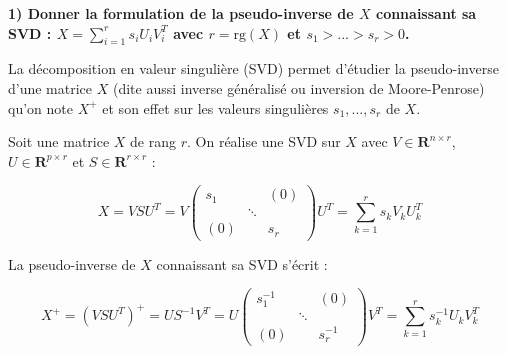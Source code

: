 \usepackage{amsmath}


\textbf{1) Donner la formulation de la pseudo-inverse de $X$ connaissant sa SVD : $X = \sum_{i=1}^r s_i U_i V_{i}^T$ avec $r=\mathrm{rg}(X)$ et $s_1 > ... > s_r > 0$.}

\bigskip

La d\'ecomposition en valeur singuli\`ere (SVD) permet d'\'etudier la pseudo-inverse d'une matrice $X$ (dite aussi inverse g\'en\'eralis\'e ou inversion de Moore-Penrose) qu'on note $X^{+}$ et son effet sur les valeurs singuli\`eres $s_1,...,s_r$ de $X$.

\bigskip

Soit une matrice $X$ de rang $r$. On r\'ealise une SVD sur $X$ avec $V \in \mathbf{R}^{n \times r}$, $ U \in \mathbf{R}^{p\times r}$ et $ S \in \mathbf{R}^{r\times r}$ :

$$ X = V S U^T = V \begin{pmatrix} s_1 & & (0) \\ & \ddots & \\ (0) & & s_r  \end{pmatrix} U^T = \sum_{k=1}^{r} s_k V_k U_k^T $$

\bigskip

La pseudo-inverse de $X$ connaissant sa SVD s'\'ecrit :

$$ X^{+} = (V S U^T)^{+} = U S^{-1} V^T = U \begin{pmatrix} s_1^{-1} & & (0) \\ & \ddots & \\ (0) & & s_r^{-1}  \end{pmatrix} V^T = \sum_{k=1}^{r} s_k^{-1} U_k V_k^T $$
